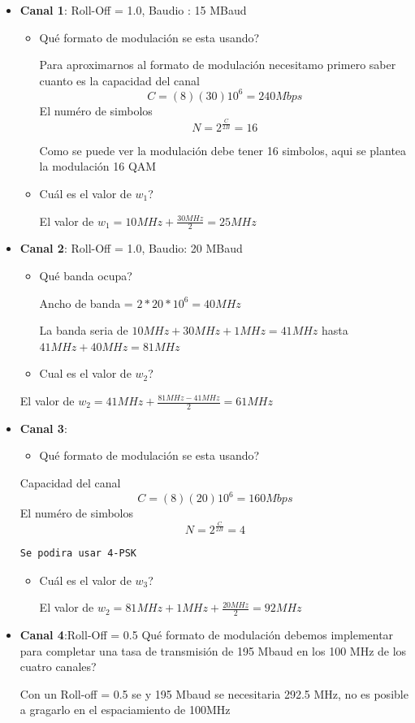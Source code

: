 \documentclass[11pt]{article}
\providecommand{\tightlist}{%
      \setlength{\itemsep}{0pt}\setlength{\parskip}{0pt}}
\begin{document}
\begin{itemize}
\item
  \textbf{Canal 1}: Roll-Off = 1.0, Baudio : 15 MBaud

  \begin{itemize}
  \item
    Qué formato de modulación se esta usando?

    Para aproximarnos al formato de modulación necesitamo primero saber
    cuanto es la capacidad del canal \[C = (8)(30)10^6 = 240Mbps \] El
    numéro de simbolos \[N = 2^{\frac{C}{2B}} =16\]

    Como se puede ver la modulación debe tener 16 simbolos, aqui se
    plantea la modulación 16 QAM
  \item
    Cuál es el valor de \(w_1\)?

    El valor de \(w_1 = 10MHz + \frac{30MHz}{2} = 25MHz\)
  \end{itemize}
\item
  \textbf{Canal 2}: Roll-Off = 1.0, Baudio: 20 MBaud

  \begin{itemize}
  \item
    Qué banda ocupa?

    Ancho de banda = \(2 * 20*10^6 = 40MHz\)

    La banda seria de \(10MHz + 30MHz + 1MHz = 41MHz\) hasta
    \(41MHz+40MHz = 81 MHz\)
  \item
    Cual es el valor de \(w_2\)?
  \end{itemize}

  El valor de \(w_2 = 41MHz + \frac{81MHz - 41MHz}{2} = 61MHz\)
\item
  \textbf{Canal 3}:

  \begin{itemize}
  \tightlist
  \item
    Qué formato de modulación se esta usando?
  \end{itemize}

  Capacidad del canal \[C = (8)(20)10^6 = 160Mbps\] El numéro de
  simbolos \[N = 2^{\frac{C}{2B}} = 4\]

\begin{verbatim}
Se podira usar 4-PSK 
\end{verbatim}

  \begin{itemize}
  \item
    Cuál es el valor de \(w_3\)?

    El valor de \(w_2 = 81MHz+ 1MHz + \frac{20MHz}{2} = 92MHz\)
  \end{itemize}
\item
  \textbf{Canal 4}:Roll-Off = 0.5 Qué formato de modulación debemos
  implementar para completar una tasa de transmisión de 195 Mbaud en los
  100 MHz de los cuatro canales?

  Con un Roll-off = 0.5 se y 195 Mbaud se necesitaria 292.5 MHz, no es
  posible a gragarlo en el espaciamiento de 100MHz
\end{itemize}
\end{document}
